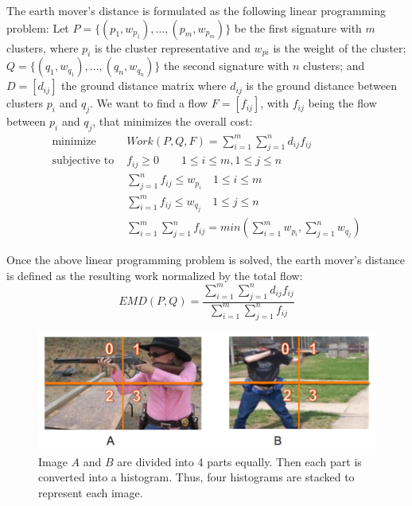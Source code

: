 \noindent The earth mover's distance is formulated as the following linear programming problem: Let $P = \{(p_1, w_{p_1} ), . . . , (p_m , w_{p_m} )\}$ be the first signature with $m$ clusters, where $p_i$ is the cluster representative and $w_{pi}$ is the weight of the cluster; $Q=\{(q_1,w_{q_1}),...,(q_n,w_{q_n})\}$ the second signature with $n$ clusters; and $D = [d_{ij}]$ the ground distance matrix where $d_{ij}$ is the ground distance between clusters $p_i$ and $q_j$. We want to find a flow $F = [f_{ij}]$, with $f_{ij}$ being the flow between $p_i$ and $q_j$, that minimizes the overall cost: 
\begin{eqnarray}
\text{minimize} & Work(P , Q, F) = \sum_{i=1}^{m}\sum_{j=1}^{n}d_{ij}f_{ij} \nonumber\\
\text{subjective to } & f_{ij} \geq 0 \quad \quad 1 \leq i \leq m,  1 \leq j \leq n \nonumber\\ 
& \sum_{j=1}^n f_{ij} \leq w_{p_i} \quad 1 \leq i \leq m \nonumber\\
& \sum_{i=1}^m f_{ij} \leq w_{q_j} \quad 1 \leq j \leq n \nonumber\\
& \sum_{i=1}^{m} \sum_{j=1}^n f_{ij} = min(\sum_{i=1}^m w_{p_i}, \sum_{j=1}^n w_{q_j}) 
\end{eqnarray}

\noindent Once the above linear programming problem is solved, the earth mover's distance is defined as the resulting work normalized by the total flow:
\begin{equation}
EMD(P, Q) = \frac{\sum_{i=1}^m \sum_{j=1}^n d_{ij} f_{ij}}{\sum_{i=1}^m\sum_{j=1}^n f_{ij}}
\end{equation}

\begin{figure}[!ht]
\centering
	\includegraphics[width=1\textwidth]{./image_EMD_Sample.png}
\caption{Image $A$ and $B$ are divided into 4 parts equally. Then each part is converted into a histogram. Thus, four histograms are stacked to represent each image.}
\end{figure}

